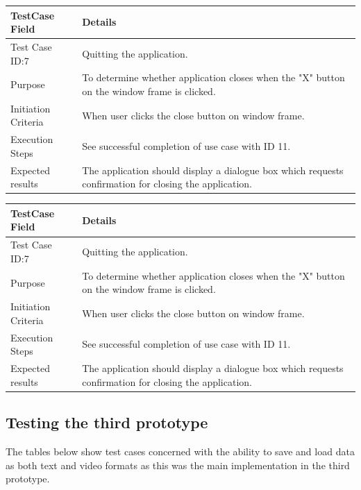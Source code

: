 \documentclass[a4paper, 12pt]{article}
\begin{document}
\begin{table}[!htb]
 \begin{tabular}{|p{4cm}|p{10cm}|}
 \hline
  TestCase Field & Details \\
  \hline
   Test Case ID:7 & Quitting the application. \\
  \hline 
   Purpose & To determine whether application closes when the "X" button on the window frame is clicked. \\
  \hline
   Initiation Criteria & When user clicks the close button on window frame.  \\
  \hline
   Execution Steps & See successful completion of use case with ID 11.  \\
  \hline
   Expected results & The application should display a dialogue box which requests confirmation for closing the application. \\
  \hline
 \end{tabular}
\end{table}


\begin{table}[!htb]
 \begin{tabular}{|p{4cm}|p{10cm}|}
 \hline
  TestCase Field & Details \\
  \hline
   Test Case ID:7 & Quitting the application. \\
  \hline 
   Purpose & To determine whether application closes when the "X" button on the window frame is clicked. \\
  \hline
   Initiation Criteria & When user clicks the close button on window frame.  \\
  \hline
   Execution Steps & See successful completion of use case with ID 11.  \\
  \hline
   Expected results & The application should display a dialogue box which requests confirmation for closing the application. \\
  \hline
 \end{tabular}
\end{table}

\clearpage
\newpage

\subsection{Testing the third prototype}

The tables below show test cases concerned with the ability to save and load data as both text and video formats as this was the main implementation in the third prototype.
\end{document}
